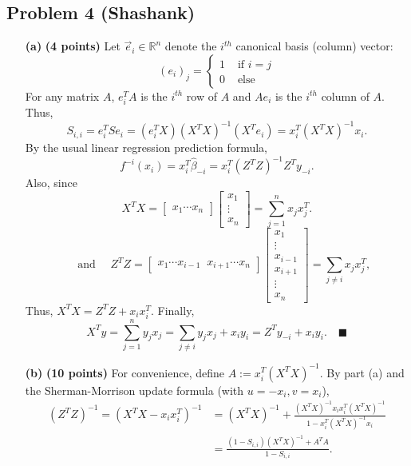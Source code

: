 \documentclass[12pt]{article}
\renewcommand{\qed}{\quad \ensuremath{\blacksquare}}    %
\newcommand{\inv}{^{-1}}                            %
\newcommand{\R}{\mathbb{R}}                         %
\renewcommand{\hat}{\widehat}
\newcommand{\1}{\mathbbm{1}}
\begin{document}
\subsection{Problem 4 (Shashank)}
\begin{enumerate}
\item[{\bf (a)}] {\bf (4 points)} Let $\vec e_i \in \R^n$ denote the $i^{th}$
canonical basis (column) vector:
\[(e_i)_j = \left\{
        \begin{array}{ll}
            1 & \mbox{ if } i = j   \\
            0 & \mbox{ else }
        \end{array}
    \right.
\]
For any matrix $A$, $e_i^TA$ is the $i^{th}$ row of $A$ and $Ae_i$ is the
$i^{th}$ column of $A$. Thus,
\[S_{i,i}
    = e_i^T S e_i
    = (e_i^T X) (X^T X)\inv (X^T e_i)
    = x_i^T (X^T X)\inv x_i.
\]
By the usual linear regression prediction formula,
\[f^{-i}(x_i) = x_i^T \hat\beta_{-i} = x_i^T (Z^T Z)\inv Z^T y_{-i}.\]
Also, since
\[X^T X
    = 
    \begin{bmatrix}
        x_1 \cdots x_n
    \end{bmatrix}
    \begin{bmatrix}
        x_1     \\
        \vdots  \\
        x_n
    \end{bmatrix}
    = \sum_{j = 1}^n x_j x_j^T.\]
\[\quad \mbox{ and } \quad
Z^T Z
    = 
    \begin{bmatrix}
        x_1 \cdots x_{i - 1} \;\; x_{i + 1} \cdots x_n
    \end{bmatrix}
    \begin{bmatrix}
        x_1         \\
        \vdots      \\
        x_{i - 1}   \\
        x_{i + 1}   \\
        \vdots      \\
        x_n
    \end{bmatrix}
    = \sum_{j \neq i} x_j x_j^T,\]
Thus, $X^T X = Z^T Z + x_i x_i^T$. Finally,
\[X^T y
    = \sum_{j = 1}^n y_j x_j
    = \sum_{j \neq i} y_j x_j + x_i y_i
    = Z^T y_{-i} + x_i y_i. \qed\]

\item[{\bf (b)}] {\bf (10 points)}
For convenience, define $A := x_i^T (X^T X)\inv$. By part (a) and the
Sherman-Morrison update formula (with $u = -x_i,v = x_i$),
\begin{align*}
(Z^T Z)\inv
    = (X^T X - x_i x_i^T)\inv
 &  = (X^T X)\inv + \frac{(X^T X)\inv x_i x_i^T (X^T X)\inv}
                         {1 - x_i^T (X^T X)\inv x_i}    \\
 &  = \frac{(1 - S_{i,i}) (X^T X)\inv + A^T A}{1 - S_{i,i}}.
\end{align*}


\end{enumerate}
\end{document}
